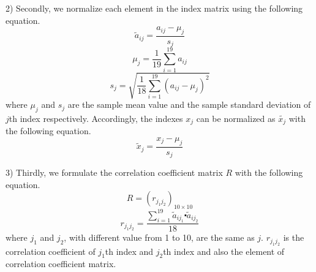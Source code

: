 \documentclass{apmcmthesis}
\begin{document}
2) Secondly, we normalize each element in the index matrix using the following equation.
\begin{equation}
{{\tilde{a}}_{ij}}=\frac{{{a}_{ij}}-{{\mu }_{j}}}{{{s}_{j}}}
\end{equation}
\begin{equation}
{{\mu }_{j}}=\frac{1}{19}\sum\limits_{i=1}^{19}{{{a}_{ij}}}
\end{equation}
\begin{equation}
{{s}_{j}}=\sqrt{\frac{1}{18}\sum\limits_{i=1}^{19}{{{({{a}_{ij}}-{{\mu }_{j}})}^{2}}}}
\end{equation}
where ${{\mu }_{j}}$ and ${{s}_{j}}$ are the sample mean value and the sample standard deviation of $j$th index respectively. Accordingly, the indexes $x_j$ can be normalized as ${{\tilde{x_j}}}$ with the following equation.
\begin{equation}
{{\tilde{x}}_{j}}=\frac{{{x}_{j}}-{{\mu }_{j}}}{{{s}_{j}}}
\end{equation}

3) Thirdly, we formulate the correlation coefficient matrix $R$ with the following equation.
\begin{equation}
R=({{r}_{{{j}_{1}}{{j}_{2}}}})_{10\times 10}
\end{equation}
\begin{equation}
{{r}_{{{j}_{1}}{{j}_{2}}}}=\frac{\sum\limits_{i=1}^{19}{{{{\tilde{a}}}_{i{{j}_{1}}}}}\centerdot {{{\tilde{a}}}_{i{{j}_{2}}}}}{18}
\end{equation}
where $j_1$ and $j_2$, with different value from 1 to 10, are the same as $j$. ${{r}_{{{j}_{1}}{{j}_{2}}}}$ is the correlation coefficient of $j_1$th index and $j_2$th index and also the element of correlation coefficient matrix.
\end{document}
